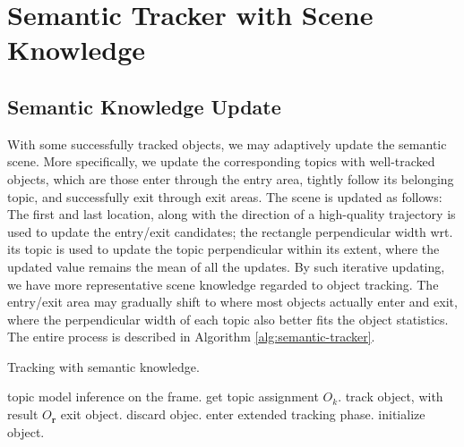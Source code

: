 \section{Semantic Tracker with Scene Knowledge}

\subsection{Semantic Knowledge Update}
With some successfully tracked objects, we may adaptively update the semantic scene. 
More specifically, we update the corresponding topics with well-tracked objects, which are those enter through the entry area, tightly follow its belonging topic, and successfully exit through exit areas. 
The scene is updated as follows: 
The first and last location, along with the direction of a high-quality trajectory is used to update the entry/exit candidates; the rectangle perpendicular width wrt. its topic is used to update the topic perpendicular within its extent, where the updated value remains the mean of all the updates.
By such iterative updating, we have more representative scene knowledge regarded to object tracking. The entry/exit area may gradually shift to where most objects actually enter and exit, where the perpendicular width of each topic also better fits the object statistics. The entire process is described in Algorithm \ref{alg:semantic-tracker}.

\begin{algorithm}
 \caption{Tracking with semantic knowledge.}\label{alg:semantic-tracker}
 \begin{algorithmic}[1]
     \State topic model inference on the frame.
     \State get topic assignment $O_k$.
     \State track object, with result $O_{\bm{r}}$
            \State exit object.
        \EndIf
            \State discard objec.
    \EndIf
         \State enter extended tracking phase.
     \EndIf
 \EndFor
   \State initialize object.
   \EndIf
 \EndFor
\EndFor
\end{algorithmic}
\end{algorithm}
